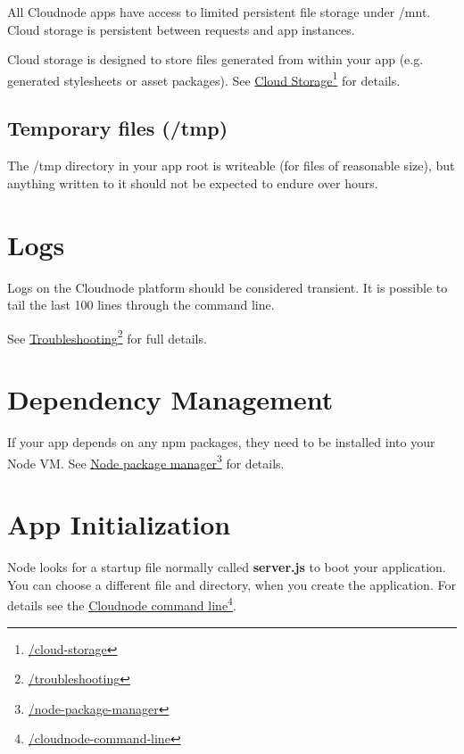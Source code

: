 All Cloudnode apps have access to limited persistent file storage under \slash mnt. Cloud storage is persistent between requests and app instances.

Cloud storage is designed to store files generated from within your app (e.g. generated stylesheets or asset packages). See \href{/cloud-storage}{Cloud Storage}\footnote{\href{/cloud-storage}{\slash cloud-storage}} for details.

\subsection{Temporary files (\slash tmp)}
\label{temporaryfilestmp}

The \slash tmp directory in your app root is writeable (for files of reasonable size), but anything written to it should not be expected to endure over hours.



\section{Logs}
\label{logs}

Logs on the Cloudnode platform should be considered transient. It is possible to tail the last 100 lines through the command line.

See \href{/troubleshooting}{Troubleshooting}\footnote{\href{/troubleshooting}{\slash troubleshooting}} for full details.



\section{Dependency Management}
\label{dependencymanagement}

If your app depends on any npm packages, they need to be installed into your Node VM. See \href{/node-package-manager}{Node package manager}\footnote{\href{/node-package-manager}{\slash node-package-manager}} for details.



\section{App Initialization}
\label{appinitialization}

Node looks for a startup file normally called \textbf{server.js} to boot your application. You can choose a different file and directory, when you create the application. For details see the \href{/cloudnode-command-line}{Cloudnode command line}\footnote{\href{/cloudnode-command-line}{\slash cloudnode-command-line}}.



